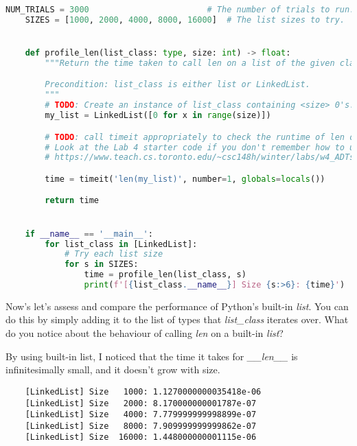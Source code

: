 \documentclass[12pt]{article}
\begin{document}
\begin{enumerate}[1.]
\begin{mdframed}
\begin{lstlisting}[language=python,caption={task\_2\_step\_3\_solution.py}]
    NUM_TRIALS = 3000                        # The number of trials to run.
    SIZES = [1000, 2000, 4000, 8000, 16000]  # The list sizes to try.


    def profile_len(list_class: type, size: int) -> float:
        """Return the time taken to call len on a list of the given class and size.

        Precondition: list_class is either list or LinkedList.
        """
        # TODO: Create an instance of list_class containing <size> 0's.
        my_list = LinkedList([0 for x in range(size)])

        # TODO: call timeit appropriately to check the runtime of len on the list.
        # Look at the Lab 4 starter code if you don't remember how to use timeit:
        # https://www.teach.cs.toronto.edu/~csc148h/winter/labs/w4_ADTs/starter-code/timequeue.py

        time = timeit('len(my_list)', number=1, globals=locals())

        return time


    if __name__ == '__main__':
        for list_class in [LinkedList]:
            # Try each list size
            for s in SIZES:
                time = profile_len(list_class, s)
                print(f'[{list_class.__name__}] Size {s:>6}: {time}')

    \end{lstlisting}

    \end{mdframed}

    \bigskip

    Now’s let’s assess and compare the performance of Python’s built-in \textit{list}.
    You can do this by simply adding it to the list of types that \textit{list\_class}
    iterates over. What do you notice about the behaviour of calling \textit{len} on
    a built-in \textit{list}?

    \bigskip

    \begin{mdframed}
    By using built-in list, I noticed that the time it takes for \textit{\_\_len\_\_}
    is infinitesimally small, and it doesn't grow with size.

    \begin{lstlisting}
    [LinkedList] Size   1000: 1.1270000000035418e-06
    [LinkedList] Size   2000: 8.170000000001787e-07
    [LinkedList] Size   4000: 7.779999999998899e-07
    [LinkedList] Size   8000: 7.909999999999862e-07
    [LinkedList] Size  16000: 1.448000000001115e-06
    \end{lstlisting}
    \end{mdframed}


\end{enumerate}
\end{document}

